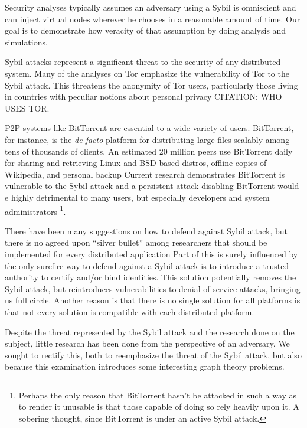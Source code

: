 \documentclass[10pt,a4paper]{article}
\begin{document}
Security analyses typically assumes an adversary using a Sybil is omniscient and can inject virtual nodes wherever he chooses in a reasonable amount of time. 
Our goal is to demonstrate how veracity of that assumption by doing analysis and simulations.

Sybil attacks represent a significant threat to the security of any distributed system.
Many of the analyses \cite{bauer2007low} on Tor \cite{dingledine2004tor} emphasize the vulnerability of Tor to the Sybil attack.
This threatens the anonymity of Tor users, particularly those living in countries with peculiar notions about personal privacy CITATION:  WHO USES TOR.

P2P systems like BitTorrent are essential to a wide variety of users.
BitTorrent, for instance, is the \textit{de facto} platform for distributing large files scalably among tens of thousands of clients.
An estimated 20 million peers use BitTorrent daily for sharing and retrieving Linux and BSD-based distros, offline copies of Wikipedia, and personal backup
Current research demonstrates  BitTorrent is vulnerable to the Sybil attack and a persistent attack disabling BitTorrent would e highly detrimental to many users, but especially developers and system administrators \footnote{Perhaps the only reason that BitTorrent hasn't be attacked in such a way as to render it unusable is that those capable of doing so rely heavily upon it.  A sobering thought, since BitTorrent is under an active Sybil attack.}.


There have been many suggestions on how to defend against Sybil attack, but there is no agreed upon ``silver bullet'' among researchers that should be implemented for every distributed application \cite{levine2006survey}
Part of this is surely influenced by the only surefire way to defend against a Sybil attack is to introduce a trusted authority to certify and/or bind identities.
This solution potentially removes the Sybil attack, but reintroduces vulnerabilities to denial of service attacks, bringing us full circle.
Another reason is that there is no single solution for all platforms is that not every solution is compatible with each distributed platform.


Despite the threat represented by the Sybil attack and the research done on the subject, little research has been done from the perspective of an adversary.
We sought to rectify this, both to reemphasize the threat of the Sybil attack, but also because this examination introduces some interesting graph theory problems.
\end{document}
